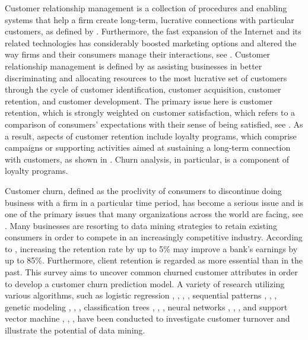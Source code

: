 Customer relationship management is a collection of procedures and
enabling systems that help a firm create long-term, lucrative
connections with particular customers, as defined by \citet{Ling2001}.
Furthermore, the fast expansion of the Internet and its related
technologies has considerably boosted marketing options and altered the
way firms and their consumers manage their interactions, see
\citet{Ngai2005}. Customer relationship management is defined by
\citet{Ngai2009} as assisting businesses in better discriminating and
allocating resources to the most lucrative set of customers through the
cycle of customer identification, customer acquisition, customer
retention, and customer development. The primary issue here is customer
retention, which is strongly weighted on customer satisfaction, which
refers to a comparison of consumers' expectations with their sense of
being satisfied, see \citet{Krack2004}. As a result, aspects of customer
retention include loyalty programs, which comprise campaigns or
supporting activities aimed at sustaining a long-term connection with
customers, as shown in \citet{Ngai2009}. Churn analysis, in particular,
is a component of loyalty programs.

Customer churn, defined as the proclivity of consumers to discontinue
doing business with a firm in a particular time period, has become a
serious issue and is one of the primary issues that many organizations
across the world are facing, see \citet{Chandar2006}. Many businesses
are resorting to data mining strategies to retain existing consumers in
order to compete in an increasingly competitive industry. According to
\citet{Nie2011}, increasing the retention rate by up to 5\% may improve
a bank's earnings by up to 85\%. Furthermore, client retention is
regarded as more essential than in the past. This survey aims to uncover
common churned customer attributes in order to develop a customer churn
prediction model. A variety of research utilizing various algorithms,
such as logistic regression \citep{Peng2014}, \citep{Jain2020},
\citep{Jain2021}, \citep{Dijendra2021}, sequential patterns
\citep{Thiago2019}, \citep{Culbert2018}, \citep{Stojanovski2017},
genetic modeling \citep{Faris2014}, \citep{Abb2013},
\citep{Stripling2018}, classification trees \citep{Hoppner2020},
\citep{Doro2020}, \citep{Ahmad2019}, neural networks \citep{Khan2019},
\citep{Brandusoiu2020}, \citep{Saghir2019}, and support vector machine
\citep{Rodan2014}, \citep{Xia2008}, \citep{Li2010}, have been conducted
to investigate customer turnover and illustrate the potential of data
mining.

